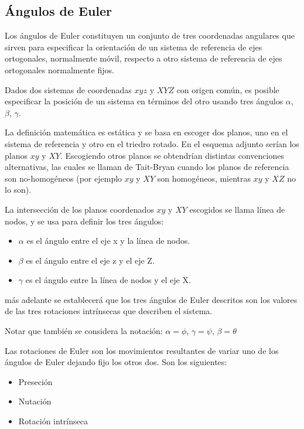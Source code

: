 \subsection*{Ángulos de Euler}

Los ángulos de Euler constituyen un conjunto de tres coordenadas angulares que
sirven para especificar la orientación de un sistema de referencia de ejes
ortogonales, normalmente móvil, respecto a otro sistema de referencia de ejes
ortogonales normalmente fijos.

Dados dos sistemas de coordenadas $xyz$ y $XYZ$ con origen común, es posible
especificar la posición de un sistema en términos del otro usando tres ángulos
$\alpha$, $\beta$, $\gamma$.

La definición matemática es estática y se basa en escoger dos planos, uno en el
sistema de referencia y otro en el triedro rotado. En el esquema adjunto serían
los planos $xy$ y $XY$. Escogiendo otros planos se obtendrían distintas convenciones
alternativas, las cuales se llaman de Tait-Bryan cuando los planos de referencia
son no-homogéneos (por ejemplo $xy$ y $XY$ son homogéneos, mientras $xy$ y $XZ$ no lo
son).

La intersección de los planos coordenados $xy$ y $XY$ escogidos se llama línea de
nodos, y se usa para definir los tres ángulos:

\begin{itemize}
    \item $\alpha$ es el ángulo entre el eje x y la línea de nodos.
    \item $\beta$  es el ángulo entre el eje z y el eje Z.
    \item $\gamma$  es el ángulo entre la línea de nodos y el eje X.
\end{itemize}

más adelante se establecerá que los tres ángulos de Euler descritos son los
valores de las tres rotaciones intrínsecas que describen el sistema.

Notar que también se considera la notación: $\alpha =\phi$, $\gamma =\psi$,
$\beta =\theta$

Las rotaciones de Euler son los movimientos resultantes de variar uno de los
ángulos de Euler dejando fijo los otros dos. Son los siguientes:

\begin{itemize}
    \item Preseción
    \item Nutación
    \item Rotación intrínseca
\end{itemize}

